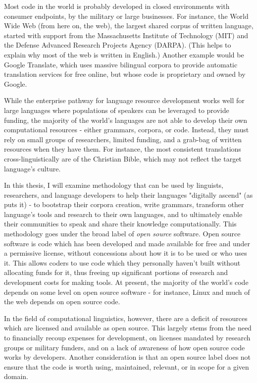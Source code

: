 Most code in the world is probably developed in closed environments with consumer endpoints, by the military or large businesses. For instance, the World Wide Web (from here on, the web), the largest shared corpus of written language, started with support from  the Massachusetts Institute of Technology (MIT) and the Defense Advanced Research Projects Agency (DARPA). (This helps to explain why most of the web is written in English.) Another example would be Google Translate, which uses massive bilingual corpora to provide automatic translation services for free online, but whose code is proprietary and owned by Google.

While the enterprise pathway for language resource development works well for large languages where populations of speakers can be leveraged to provide funding, the majority of the world's languages are not able to develop their own computational resources - either grammars, corpora, or code. Instead, they must rely on small groups of researchers, limited funding, and a grab-bag of written resources when they have them. For instance, the most consistent translations cross-linguistically are of the Christian Bible, which may not reflect the target language's culture.

In this thesis, I will examine methodology that can be used by linguists, researchers, and language developers to help their languages "digitally ascend" (as \citet{kornai2013digital} puts it) - to bootstrap their corpora creation, write grammars, transform other language's tools and research to their own languages, and to ultimately enable their communities to speak and share their knowledge computationally. This methodology goes under the broad label of \textit{open source} software. Open source software is code which has been developed and made available for free and under a permissive license, without concessions about how it is to be used or who uses it. This allows coders to use code which they personally haven't built without allocating funds for it, thus freeing up significant portions of research and development costs for making tools. At present, the majority of the world's code depends on some level on open source software - for instance, Linux and much of the web depends on open source code.

In the field of computational linguistics, however, there are a deficit of resources which are licensed and available as open source. This largely stems from the need to financially recoup expenses for development, on licenses mandated by research groups or military funders, and on a lack of awareness of how open source code works by developers. Another consideration is that an open source label does not ensure that the code is worth using, maintained, relevant, or in scope for a given domain.

